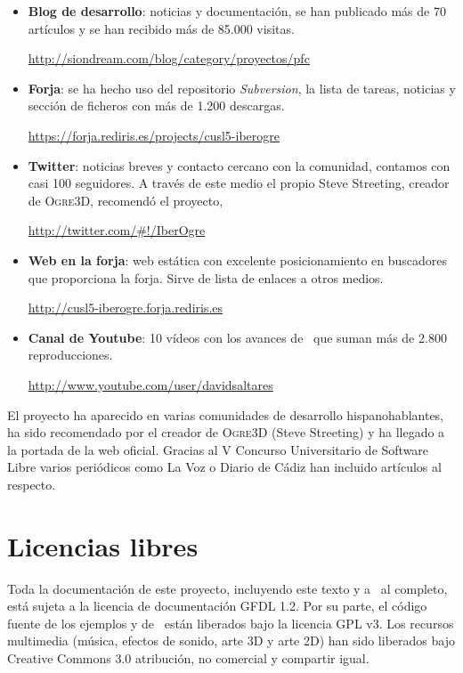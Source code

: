 \documentclass[a4paper,11pt]{article}
\begin{document}
\begin{itemize}
    \item \textbf{Blog de desarrollo}: noticias y documentación, se han
    publicado más de 70 artículos y se han recibido más de 85.000 visitas.

    \url{http://siondream.com/blog/category/proyectos/pfc}
    
    \item \textbf{Forja}: se ha hecho uso del repositorio \textit{Subversion},
    la lista de tareas, noticias y sección de ficheros con más de 1.200 descargas.
    
    \url{https://forja.rediris.es/projects/cusl5-iberogre}
    
    \item \textbf{Twitter}: noticias breves y contacto cercano con la comunidad,
    contamos con casi 100 seguidores. A través de este medio el propio Steve Streeting,
    creador de \textsc{Ogre3D}, recomendó el proyecto,
    
    \url{http://twitter.com/#!/IberOgre}
    
    \item \textbf{Web en la forja}: web estática con excelente posicionamiento
    en buscadores que proporciona la forja. Sirve de lista de enlaces a otros
    medios.
    
    \url{http://cusl5-iberogre.forja.rediris.es}
    
    \item \textbf{Canal de Youtube}: 10 vídeos con los avances de \juego\
    que suman más de 2.800 reproducciones.
    
    \url{http://www.youtube.com/user/davidsaltares}
    
\end{itemize}

\noindent El proyecto ha aparecido en varias comunidades de desarrollo hispanohablantes,
ha sido recomendado por el creador de \textsc{Ogre3D} (Steve Streeting) y
ha llegado a la portada de la web oficial. Gracias al V Concurso Universitario
de Software Libre varios periódicos como La Voz o Diario de Cádiz han incluido
artículos al respecto.\\

\section{Licencias libres}

\noindent Toda la documentación de este proyecto, incluyendo este texto y a \wiki\ al
completo, está sujeta a la licencia de documentación GFDL 1.2. Por su
parte, el código fuente de los ejemplos y de \juego\ están liberados
bajo la licencia GPL v3. Los recursos multimedia (música, efectos de sonido,
arte 3D y arte 2D) han sido liberados bajo Creative Commons 3.0 atribución,
no comercial y compartir igual.\\
\end{document}
